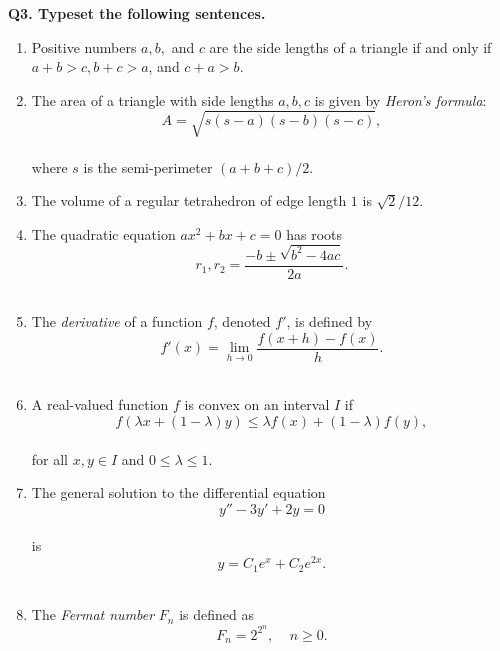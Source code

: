 \documentclass{article}
\begin{document}
	\noindent \textbf{Q3. Typeset the following sentences.}
	\begin{enumerate}
		\item Positive numbers $a, b,$ and $c$ are the side lengths of a triangle if and only if $a+b>c, b+c>a$, and $c+a>b$.\\
		\item The area of a triangle with side lengths $a, b, c$ is given by \textit{Heron's formula}: \\ \[A = \sqrt{s(s-a)(s-b)(s-c)},\] \\ where $s$ is the semi-perimeter $(a+b+c)/2$.\\
		\item The volume of a regular tetrahedron of edge length $1$ is $\sqrt{2}/12$.\\
		\item The quadratic equation $ax^2+bx+c=0$ has roots \\ \[r_1,r_2=\frac{-b \pm \sqrt{b^2-4ac}}{2a}.\]\\
		\item The \textit{derivative} of a function $f$, denoted $f'$, is defined by \\ \[f'(x)=\lim_{h \to 0} \frac{f(x+h)-f(x)}{h}.\]\\
		\item A real-valued function $f$ is convex on an interval $I$ if \\ \[f(\lambda x+(1-\lambda)y) \leq \lambda f(x)+(1-\lambda)f(y),\] \\ for all $x,y \in I$ and $0 \leq \lambda \leq 1$.\\
		\item The general solution to the differential equation \\ \[y''-3y'+2y=0\] \\ is \\ \[y=C_1e^x + C_2e^{2x}.\]\\
		\item The \textit{Fermat number} $F_n$ is defined as \\ \[F_n=2^{2^n}, \;\;\;\; n \geq 0.\]
	\end{enumerate}
	
\end{document}

